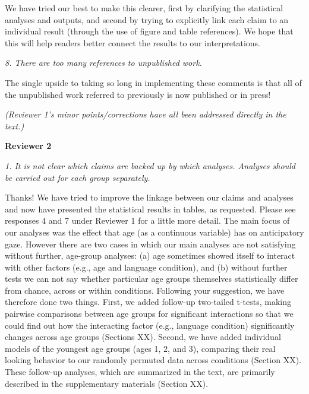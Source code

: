 \documentclass[11pt,a4paper]{letter} %
\begin{document}
\begin{letter}{}
\noindent We have tried our best to make this clearer, first by clarifying the statistical analyses and outputs, and second by trying to explicitly link each claim to an individual result (through the use of figure and table references). We hope that this will help readers better connect the results to our interpretations.

\smallskip

\noindent \textit{8. There are too many references to unpublished work.}

\noindent The single upside to taking so long in implementing these comments is that all of the unpublished work referred to previously is now published or in press!

\smallskip

\noindent \textit{(Reviewer 1's minor points/corrections have all been addressed directly in the text.)}

\bigskip

\noindent \textbf{Reviewer 2}

\noindent \textit{1. It is not clear which claims are backed up by which analyses. Analyses should be carried out for each group separately.}

\noindent Thanks! We have tried to improve the linkage between our claims and analyses and now have presented the statistical results in tables, as requested. Please see responses 4 and 7 under Reviewer 1 for a little more detail. The main focus of our analyses was the effect that age (as a continuous variable) has on anticipatory gaze. However there are two cases in which our main analyses are not satisfying without further, age-group analyses: (a) age sometimes showed itself to interact with other factors (e.g., age and language condition), and (b) without further tests we can not say whether particular age groups themselves statistically differ from chance, across or within conditions. Following your suggestion, we have therefore done two things. First, we added follow-up two-tailed t-tests, making pairwise comparisons between age groups for significant interactions so that we could find out how the interacting factor (e.g., language condition) significantly changes across age groups (Sections XX). Second, we have added individual models of the youngest age groups (ages 1, 2, and 3), comparing their real looking behavior to our randomly permuted data across conditions (Section XX). These follow-up analyses, which are summarized in the text, are primarily described in the supplementary materials (Section XX).


\end{letter}
\end{document}

